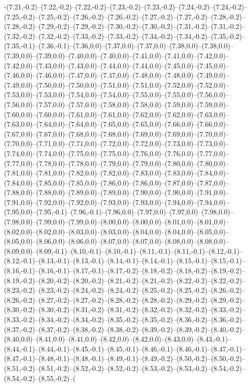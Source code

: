 -(7.21,-0.2)--(7.22,-0.2)--(7.22,-0.2)--(7.23,-0.2)--(7.23,-0.2)--(7.24,-0.2)--(7.24,-0.2)--(7.25,-0.2)--(7.25,-0.2)--(7.26,-0.2)--(7.26,-0.2)--(7.27,-0.2)--(7.27,-0.2)--(7.28,-0.2)--(7.28,-0.2)--(7.29,-0.2)--(7.29,-0.2)--(7.30,-0.2)--(7.30,-0.2)--(7.31,-0.2)--(7.31,-0.2)--(7.32,-0.2)--(7.32,-0.2)--(7.33,-0.2)--(7.33,-0.2)--(7.34,-0.2)--(7.34,-0.2)--(7.35,-0.2)--(7.35,-0.1)--(7.36,-0.1)--(7.36,0.0)--(7.37,0.0)--(7.37,0.0)--(7.38,0.0)--(7.38,0.0)--(7.39,0.0)--(7.39,0.0)--(7.40,0.0)--(7.40,0.0)--(7.41,0.0)--(7.41,0.0)--(7.42,0.0)--(7.42,0.0)--(7.43,0.0)--(7.43,0.0)--(7.44,0.0)--(7.44,0.0)--(7.45,0.0)--(7.45,0.0)--(7.46,0.0)--(7.46,0.0)--(7.47,0.0)--(7.47,0.0)--(7.48,0.0)--(7.48,0.0)--(7.49,0.0)--(7.49,0.0)--(7.50,0.0)--(7.50,0.0)--(7.51,0.0)--(7.51,0.0)--(7.52,0.0)--(7.52,0.0)--(7.53,0.0)--(7.53,0.0)--(7.54,0.0)--(7.54,0.0)--(7.55,0.0)--(7.55,0.0)--(7.56,0.0)--(7.56,0.0)--(7.57,0.0)--(7.57,0.0)--(7.58,0.0)--(7.58,0.0)--(7.59,0.0)--(7.59,0.0)--(7.60,0.0)--(7.60,0.0)--(7.61,0.0)--(7.61,0.0)--(7.62,0.0)--(7.62,0.0)--(7.63,0.0)--(7.63,0.0)--(7.64,0.0)--(7.64,0.0)--(7.65,0.0)--(7.65,0.0)--(7.66,0.0)--(7.66,0.0)--(7.67,0.0)--(7.67,0.0)--(7.68,0.0)--(7.68,0.0)--(7.69,0.0)--(7.69,0.0)--(7.70,0.0)--(7.70,0.0)--(7.71,0.0)--(7.71,0.0)--(7.72,0.0)--(7.72,0.0)--(7.73,0.0)--(7.73,0.0)--(7.74,0.0)--(7.74,0.0)--(7.75,0.0)--(7.75,0.0)--(7.76,0.0)--(7.76,0.0)--(7.77,0.0)--(7.77,0.0)--(7.78,0.0)--(7.78,0.0)--(7.79,0.0)--(7.79,0.0)--(7.80,0.0)--(7.80,0.0)--(7.81,0.0)--(7.81,0.0)--(7.82,0.0)--(7.82,0.0)--(7.83,0.0)--(7.83,0.0)--(7.84,0.0)--(7.84,0.0)--(7.85,0.0)--(7.85,0.0)--(7.86,0.0)--(7.86,0.0)--(7.87,0.0)--(7.87,0.0)--(7.88,0.0)--(7.88,0.0)--(7.89,0.0)--(7.89,0.0)--(7.90,0.0)--(7.90,0.0)--(7.91,0.0)--(7.91,0.0)--(7.92,0.0)--(7.92,0.0)--(7.93,0.0)--(7.93,0.0)--(7.94,0.0)--(7.94,0.0)--(7.95,0.0)--(7.95,-0.1)--(7.96,-0.1)--(7.96,0.0)--(7.97,0.0)--(7.97,0.0)--(7.98,0.0)--(7.98,0.0)--(7.99,0.0)--(7.99,0.0)--(8.00,0.0)--(8.00,0.0)--(8.01,0.0)--(8.01,0.0)--(8.02,0.0)--(8.02,0.0)--(8.03,0.0)--(8.03,0.0)--(8.04,0.0)--(8.04,0.0)--(8.05,0.0)--(8.05,0.0)--(8.06,0.0)--(8.06,0.0)--(8.07,0.0)--(8.07,0.0)--(8.08,0.0)--(8.08,0.0)--(8.09,0.0)--(8.09,-0.1)--(8.10,-0.1)--(8.10,-0.1)--(8.11,-0.1)--(8.11,-0.1)--(8.12,-0.1)--(8.12,-0.1)--(8.13,-0.1)--(8.13,-0.1)--(8.14,-0.1)--(8.14,-0.1)--(8.15,-0.1)--(8.15,-0.1)--(8.16,-0.1)--(8.16,-0.1)--(8.17,-0.1)--(8.17,-0.2)--(8.18,-0.2)--(8.18,-0.2)--(8.19,-0.2)--(8.19,-0.2)--(8.20,-0.2)--(8.20,-0.2)--(8.21,-0.2)--(8.21,-0.2)--(8.22,-0.2)--(8.22,-0.2)--(8.23,-0.2)--(8.23,-0.2)--(8.24,-0.2)--(8.24,-0.2)--(8.25,-0.2)--(8.25,-0.2)--(8.26,-0.2)--(8.26,-0.2)--(8.27,-0.2)--(8.27,-0.2)--(8.28,-0.2)--(8.28,-0.2)--(8.29,-0.2)--(8.29,-0.2)--(8.30,-0.2)--(8.30,-0.2)--(8.31,-0.2)--(8.31,-0.2)--(8.32,-0.2)--(8.32,-0.2)--(8.33,-0.2)--(8.33,-0.2)--(8.34,-0.2)--(8.34,-0.2)--(8.35,-0.2)--(8.35,-0.2)--(8.36,-0.2)--(8.36,-0.2)--(8.37,-0.2)--(8.37,-0.2)--(8.38,-0.2)--(8.38,-0.2)--(8.39,-0.2)--(8.39,-0.2)--(8.40,-0.2)--(8.40,0.0)--(8.41,0.0)--(8.41,0.0)--(8.42,0.0)--(8.42,0.0)--(8.43,0.0)--(8.43,-0.1)--(8.44,-0.1)--(8.44,-0.1)--(8.45,-0.1)--(8.45,-0.1)--(8.46,-0.1)--(8.46,-0.1)--(8.47,-0.1)--(8.47,-0.1)--(8.48,-0.1)--(8.48,-0.1)--(8.49,-0.1)--(8.49,-0.2)--(8.50,-0.2)--(8.50,-0.2)--(8.51,-0.2)--(8.51,-0.2)--(8.52,-0.2)--(8.52,-0.2)--(8.53,-0.2)--(8.53,-0.2)--(8.54,-0.2)--(8.54,-0.2)--(8.55,-0.2)--(